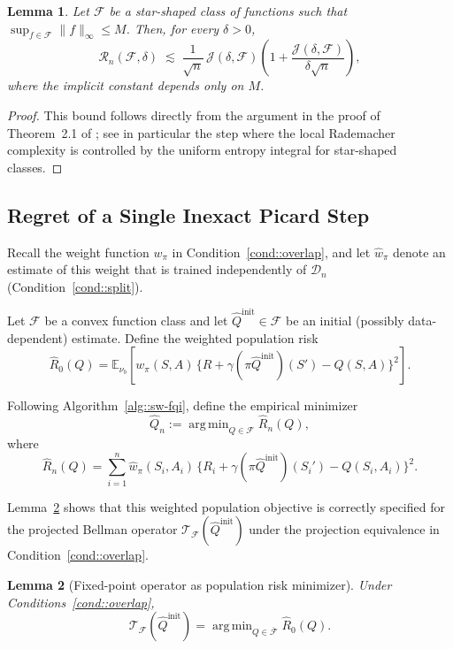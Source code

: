 \documentclass{article}
\DeclareMathOperator*{\argmin}{arg\,min}
\newcommand{\E}{\mathbb{E}}
\theoremstyle{plain}
\newtheorem{lemma}{Lemma}
\theoremstyle{definition}
\theoremstyle{remark}
\begin{document}
\begin{lemma}\label{lemma:local_rademacher_entropy}
Let \(\mathcal{F}\) be a star-shaped class of functions such that
\(\sup_{f\in\mathcal F}\|f\|_\infty \le M\). Then, for every \(\delta>0\),
\[
\mathcal{R}_n(\mathcal{F}, \delta)
\;\lesssim\;
\frac{1}{\sqrt n}\,\mathcal{J}(\delta,\mathcal{F})
\left(1+\frac{\mathcal{J}(\delta,\mathcal{F})}{\delta \sqrt n}\right),
\]
where the implicit constant depends only on \(M\).
\end{lemma}
\begin{proof}
This bound follows directly from the argument in the proof of
Theorem~2.1 of \citet{van2011local}; see in particular the step where
the local Rademacher complexity is controlled by the uniform entropy
integral for star-shaped classes.
\end{proof}

\subsection{Regret of a Single Inexact Picard Step}

 
Recall the weight function $w_{\pi}$ in Condition~\ref{cond::overlap}, and let
$\hat{w}_{\pi}$ denote an estimate of this weight that is trained independently of $\mathcal{D}_n$ (Condition~\ref{cond::split}).

Let $\mathcal{F}$ be a convex function class and let 
$\hat{Q}^{\mathrm{init}} \in \mathcal{F}$ be an initial (possibly 
data-dependent) estimate. Define the weighted population risk
\[
\hat R_0(Q) = \E_{\nu_b}\!\left[
  w_{\pi}(S,A)\,
  \bigl\{
    R + \gamma(\pi \hat{Q}^{\mathrm{init}})(S') - Q(S,A)
  \bigr\}^2  
\right].
\]

Following Algorithm~\ref{alg::sw-fqi}, define the empirical minimizer
\[
\hat{Q}_n := \argmin_{Q \in \mathcal{F}} \hat R_n(Q),
\]
where
\[
\hat R_n(Q)
=
\sum_{i=1}^n
\hat{w}_{\pi}(S_i,A_i)\,
\bigl\{
  R_i + \gamma(\pi \hat{Q}^{\mathrm{init}})(S_i') - Q(S_i,A_i)
\bigr\}^2.
\]

Lemma~\ref{lem:proj-pop-risk} shows that this weighted population
objective is correctly specified for the projected Bellman operator
$\mathcal{T}_{\mathcal{F}}(\hat{Q}^{\mathrm{init}})$ under the projection
equivalence in Condition~\ref{cond::overlap}.




\begin{lemma}[Fixed-point operator as population risk minimizer]
\label{lem:proj-pop-risk}
Under Conditions~\ref{cond::overlap},
\[
\mathcal{T}_{\mathcal{F}}(\hat{Q}^{\mathrm{init}})
= \argmin_{Q \in \overline{\mathcal{F}}} \hat R_0(Q).
\]
\end{lemma}
\end{document}
